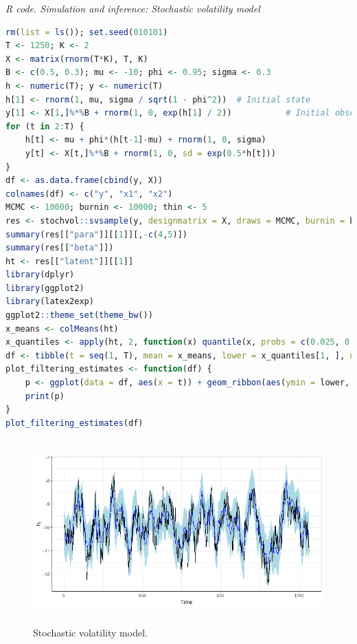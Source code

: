 \begin{tcolorbox}[enhanced,width=4.67in,center upper,
	fontupper=\large\bfseries,drop shadow southwest,sharp corners]
	\textit{R code. Simulation and inference: Stochastic volatility model}
	\begin{VF}
		\begin{lstlisting}[language=R]
rm(list = ls()); set.seed(010101)
T <- 1250; K <- 2
X <- matrix(rnorm(T*K), T, K)
B <- c(0.5, 0.3); mu <- -10; phi <- 0.95; sigma <- 0.3
h <- numeric(T); y <- numeric(T)
h[1] <- rnorm(1, mu, sigma / sqrt(1 - phi^2))  # Initial state
y[1] <- X[1,]%*%B + rnorm(1, 0, exp(h[1] / 2))           # Initial observation
for (t in 2:T) {
	h[t] <- mu + phi*(h[t-1]-mu) + rnorm(1, 0, sigma)
	y[t] <- X[t,]%*%B + rnorm(1, 0, sd = exp(0.5*h[t]))
}
df <- as.data.frame(cbind(y, X))
colnames(df) <- c("y", "x1", "x2")
MCMC <- 10000; burnin <- 10000; thin <- 5
res <- stochvol::svsample(y, designmatrix = X, draws = MCMC, burnin = burnin, thin = thin, priormu = c(0, 100), priorsigma = c(1), priorphi = c(5, 1.5), priorbeta =  c(0, 10000))
summary(res[["para"]][[1]][,-c(4,5)])
summary(res[["beta"]])
ht <- res[["latent"]][[1]]
library(dplyr)
library(ggplot2)
library(latex2exp)
ggplot2::theme_set(theme_bw())
x_means <- colMeans(ht)
x_quantiles <- apply(ht, 2, function(x) quantile(x, probs = c(0.025, 0.975)))
df <- tibble(t = seq(1, T), mean = x_means, lower = x_quantiles[1, ], upper = x_quantiles[2, ], x_true = h, observations = y)
plot_filtering_estimates <- function(df) {
	p <- ggplot(data = df, aes(x = t)) + geom_ribbon(aes(ymin = lower, ymax = upper), alpha = 1, fill = "lightblue") + geom_line(aes(y = x_true), colour = "black", alpha = 1, linewidth = 0.5) + geom_line(aes(y = mean), colour = "blue", linewidth = 0.5) + 	ylab(TeX("$h_{t}$")) + xlab("Time")
	print(p)
}
plot_filtering_estimates(df)
\end{lstlisting}
	\end{VF}
\end{tcolorbox} 

\begin{figure}[!h]
	\includegraphics[width=340pt, height=200pt]{Chapters/chapter8/figures/SVmodel.png}
	\caption[List of figure caption goes here]{Stochastic volatility model.}\label{fig4}
\end{figure} 

